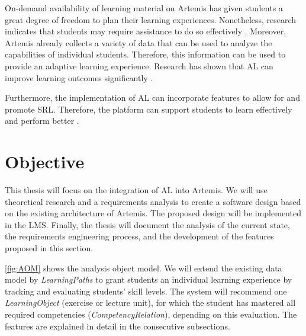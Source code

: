 \documentclass[a4paper,12pt,twoside]{article}
\begin{document}
On-demand availability of learning material on Artemis has given students a great degree of freedom to plan their learning experiences. Nonetheless, research
indicates that students may require assistance to do so effectively \cite{latham1991self}. Moreover, Artemis already collects a variety of data that can be used to analyze
the capabilities of individual students. Therefore, this information can be used to provide an adaptive learning experience. Research has shown that
\ac{AL} can improve learning outcomes significantly \cite{liu2017investigating}.

Furthermore, the implementation of \ac{AL} can incorporate features to allow for and promote \ac{SRL}. Therefore, the platform can support students to learn
effectively and perform better \cite{anthonysamy2020self}.


\section{Objective}

This thesis will focus on the integration of \ac{AL} into Artemis.
We will use theoretical research and a requirements analysis to create a software design based on the existing architecture of Artemis. The proposed
design will be implemented in the \ac{LMS}. Finally, the thesis will document the analysis of the current state, the requirements engineering process,
and the development of the features proposed in this section.

\autoref{fig:AOM} shows the analysis object model. We will extend the existing data model by \textit{LearningPaths} to grant students
an individual learning experience by tracking and evaluating students' skill levels. The system will recommend one \textit{LearningObject}
(exercise or lecture unit), for which the student has mastered all required competencies (\textit{CompetencyRelation}), depending on this evaluation.
The features are explained in detail in the consecutive subsections.
\end{document}
